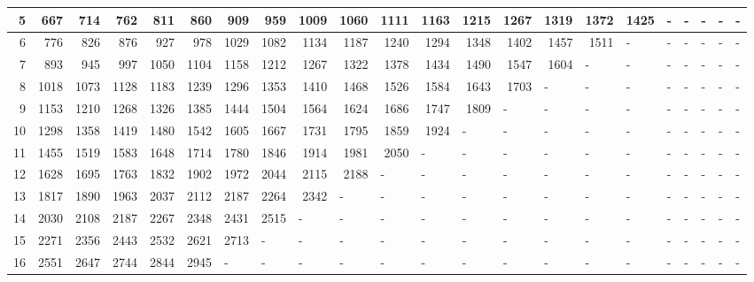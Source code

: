 \begin{appendices}
\begin{table}[H]
\begin{minipage}[b]{18.5cm}
\begin{turn}{-90}
{\begin{tabular}{|r|r|r|r|r|r|r|r|r|r|r|r|l|l|l|l|l|l|l|l|l|l|}
5 & 667 & 714 & 762 & 811 & 860 & 909 & 959 & 1009 & 1060 & 1111 & 1163 & \multicolumn{1}{r|}{1215} & \multicolumn{1}{r|}{1267} & \multicolumn{1}{r|}{1319} & \multicolumn{1}{r|}{1372} & \multicolumn{1}{r|}{1425} & - & - & - & - & - \\ \hline
6 & 776 & 826 & 876 & 927 & 978 & 1029 & 1082 & 1134 & 1187 & 1240 & 1294 & \multicolumn{1}{r|}{1348} & \multicolumn{1}{r|}{1402} & \multicolumn{1}{r|}{1457} & \multicolumn{1}{r|}{1511} & - & - & - & - & - & - \\ \hline
7 & 893 & 945 & 997 & 1050 & 1104 & 1158 & 1212 & 1267 & 1322 & 1378 & 1434 & \multicolumn{1}{r|}{1490} & \multicolumn{1}{r|}{1547} & \multicolumn{1}{r|}{1604} & - & - & - & - & - & - & - \\ \hline
8 & 1018 & 1073 & 1128 & 1183 & 1239 & 1296 & 1353 & 1410 & 1468 & 1526 & 1584 & \multicolumn{1}{r|}{1643} & \multicolumn{1}{r|}{1703} & - & - & - & - & - & - & - & - \\ \hline
9 & 1153 & 1210 & 1268 & 1326 & 1385 & 1444 & 1504 & 1564 & 1624 & 1686 & 1747 & \multicolumn{1}{r|}{1809} & - & - & - & - & - & - & - & - & - \\ \hline
10 & 1298 & 1358 & 1419 & 1480 & 1542 & 1605 & 1667 & 1731 & 1795 & 1859 & 1924 & - & - & - & - & - & - & - & - & - & - \\ \hline
11 & 1455 & 1519 & 1583 & 1648 & 1714 & 1780 & 1846 & 1914 & 1981 & 2050 & \multicolumn{1}{l|}{-} & - & - & - & - & - & - & - & - & - & - \\ \hline
12 & 1628 & 1695 & 1763 & 1832 & 1902 & 1972 & 2044 & 2115 & 2188 & \multicolumn{1}{l|}{-} & \multicolumn{1}{l|}{-} & - & - & - & - & - & - & - & - & - & - \\ \hline
13 & 1817 & 1890 & 1963 & 2037 & 2112 & 2187 & 2264 & 2342 & \multicolumn{1}{l|}{-} & \multicolumn{1}{l|}{-} & \multicolumn{1}{l|}{-} & - & - & - & - & - & - & - & - & - & - \\ \hline
14 & 2030 & 2108 & 2187 & 2267 & 2348 & 2431 & 2515 & \multicolumn{1}{l|}{-} & \multicolumn{1}{l|}{-} & \multicolumn{1}{l|}{-} & \multicolumn{1}{l|}{-} & - & - & - & - & - & - & - & - & - & - \\ \hline
15 & 2271 & 2356 & 2443 & 2532 & 2621 & 2713 & \multicolumn{1}{l|}{-} & \multicolumn{1}{l|}{-} & \multicolumn{1}{l|}{-} & \multicolumn{1}{l|}{-} & \multicolumn{1}{l|}{-} & - & - & - & - & - & - & - & - & - & - \\ \hline
16 & 2551 & 2647 & 2744 & 2844 & 2945 & \multicolumn{1}{l|}{-} & \multicolumn{1}{l|}{-} & \multicolumn{1}{l|}{-} & \multicolumn{1}{l|}{-} & \multicolumn{1}{l|}{-} & \multicolumn{1}{l|}{-} & - & - & - & - & - & - & - & - & - & - \\ \hline

\end{tabular}}
\end{turn}
\end{minipage}
\end{table}
\end{appendices}
